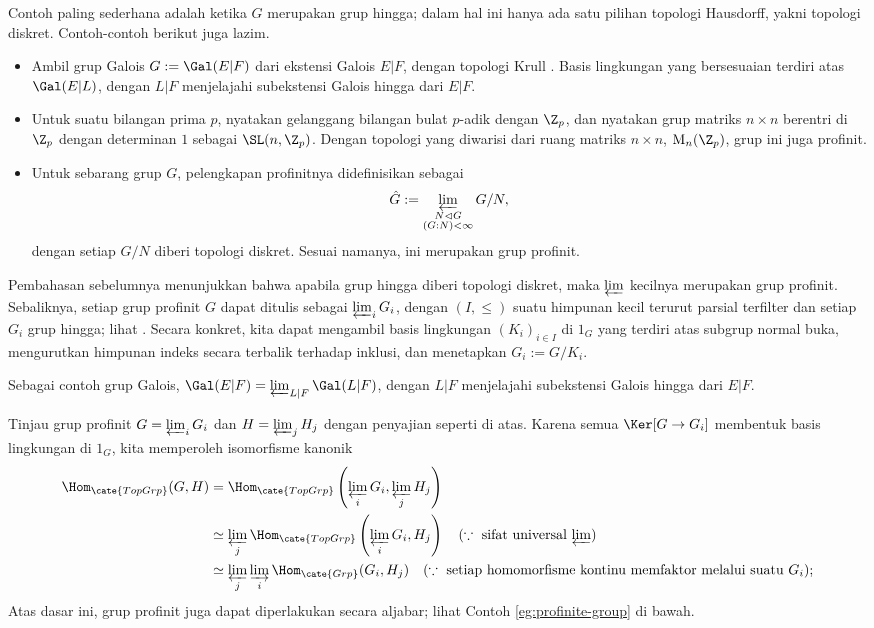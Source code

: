 \begin{example}
	Contoh paling sederhana adalah ketika $G$ merupakan grup hingga; dalam hal ini hanya ada satu pilihan topologi Hausdorff, yakni topologi diskret. Contoh-contoh berikut juga lazim.
	\begin{itemize}
		\item Ambil grup Galois $G := \Gal(E|F)$ dari ekstensi Galois $E|F$, dengan topologi Krull \cite[\S 9.2]{Li1}. Basis lingkungan yang bersesuaian terdiri atas $\Gal(E|L)$, dengan $L|F$ menjelajahi subekstensi Galois hingga dari $E|F$.
		
		\item Untuk suatu bilangan prima $p$, nyatakan gelanggang bilangan bulat $p$-adik dengan $\Z_p$, dan nyatakan grup matriks $n \times n$ berentri di $\Z_p$ dengan determinan $1$ sebagai $\SL(n, \Z_p)$. Dengan topologi yang diwarisi dari ruang matriks $n \times n$, $\mathrm{M}_n(\Z_p)$, grup ini juga profinit.
		
		\item Untuk sebarang grup $G$, pelengkapan profinitnya didefinisikan sebagai
		\[ \hat{G} := \varprojlim_{\substack{N \lhd G \\ (G:N) < \infty}} G/N, \]
		dengan setiap $G/N$ diberi topologi diskret. Sesuai namanya, ini merupakan grup profinit.
	\end{itemize}
\end{example}

\begin{remark}\label{rem:profinite-group-lim}
	Pembahasan sebelumnya menunjukkan bahwa apabila grup hingga diberi topologi diskret, maka $\varprojlim$ kecilnya merupakan grup profinit. Sebaliknya, setiap grup profinit $G$ dapat ditulis sebagai $\varprojlim_i G_i$, dengan $(I, \leq)$ suatu himpunan kecil terurut parsial terfilter dan setiap $G_i$ grup hingga; lihat \cite[Teorema 4.10.6]{Li1}. Secara konkret, kita dapat mengambil basis lingkungan $(K_i)_{i \in I}$ di $1_G$ yang terdiri atas subgrup normal buka, mengurutkan himpunan indeks secara terbalik terhadap inklusi, dan menetapkan $G_i := G/K_i$.
	
	Sebagai contoh grup Galois, $\Gal(E|F) = \varprojlim_{L|F} \Gal(L|F)$, dengan $L|F$ menjelajahi subekstensi Galois hingga dari $E|F$.
	
	Tinjau grup profinit $G = \varprojlim_i G_i$ dan $H = \varprojlim_j H_j$ dengan penyajian seperti di atas. Karena semua $\Ker[G \to G_i]$ membentuk basis lingkungan di $1_G$, kita memperoleh isomorfisme kanonik
	\begin{align*}
		\Hom_{\cate{TopGrp}}(G, H) & = \Hom_{\cate{TopGrp}}\left(\varprojlim_i G_i, \varprojlim_j H_j \right) \\
		& \simeq \varprojlim_j \Hom_{\cate{TopGrp}}\left( \varprojlim_i G_i, H_j \right) \quad \text{($\because\; $ sifat universal $\varprojlim$)} \\
		& \simeq \varprojlim_j \varinjlim_i \Hom_{\cate{Grp}}(G_i, H_j) \quad \text{($\because\; $ setiap homomorfisme kontinu memfaktor melalui suatu $G_i$)};
	\end{align*}
	Atas dasar ini, grup profinit juga dapat diperlakukan secara aljabar; lihat Contoh \ref{eg:profinite-group} di bawah.
\end{remark}

